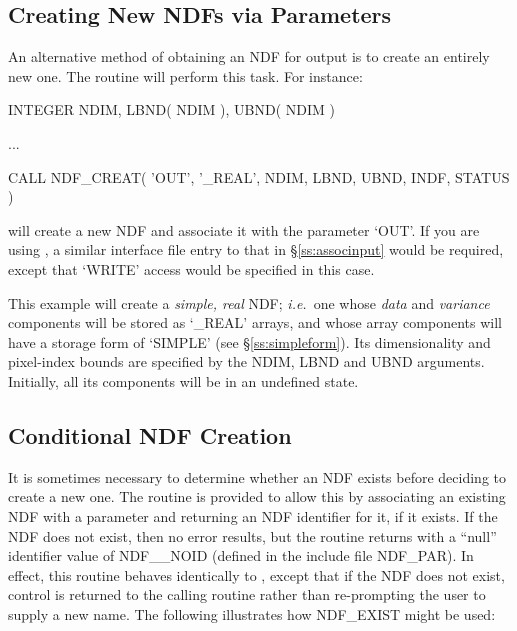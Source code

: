 \documentclass[twoside,11pt,nolof]{starlink}
\providecommand{\st}[1]{{\emph{#1}}}
\begin{document}
\subsection{\label{ss:creatingndfs}Creating New NDFs via Parameters}

An alternative method of obtaining an NDF for output is to create an
entirely new one.
The  routine will perform this task.
For instance:

\small
\begin{terminalv}
      INTEGER NDIM, LBND( NDIM ), UBND( NDIM )

      ...

      CALL NDF_CREAT( 'OUT', '_REAL', NDIM, LBND, UBND, INDF, STATUS )
\end{terminalv}
\normalsize

will create a new NDF and associate it with the parameter `OUT'.  If
you are using , a similar interface file entry to that in
\S\ref{ss:associnput} would be required, except that `WRITE' access
would be specified in this case.

This example will create a \st{simple, real\/} NDF; \st{i.e.}\ one whose
\st{data\/} and \st{variance\/} components will be stored as `\_REAL'
arrays, and whose array components will have a storage form of `SIMPLE' (see
\S\ref{ss:simpleform}).
Its dimensionality and pixel-index bounds are specified by the NDIM, LBND
and UBND arguments.
Initially, all its components will be in an undefined state.

\subsection{\label{ss:exist}Conditional NDF Creation}

It is sometimes necessary to determine whether an NDF exists before deciding
to create a new one.
The routine  is provided to allow this by associating an existing
NDF with a parameter and returning an NDF identifier for it, if it
exists.
If the NDF does not exist, then no error results, but the routine returns
with a ``null'' identifier value of NDF\_\_NOID (defined in the include file
NDF\_PAR).
In effect, this routine behaves identically to , except that if
the NDF does not exist, control is returned to the calling routine rather
than re-prompting the user to supply a new name.
The following illustrates how NDF\_EXIST might be used:
\end{document}

